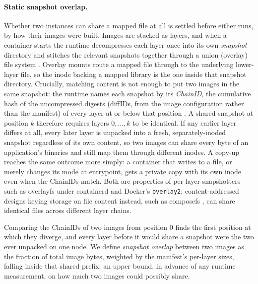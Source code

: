 \documentclass[sigplan,10pt,natbib=false]{acmart}
\begin{document}
\paragraph{Static snapshot overlap.}
Whether two instances can share a mapped file at all is settled before
either runs, by how their images were built. Images are stacked as
layers, and when a container starts the runtime decompresses each
layer once into its own \emph{snapshot} directory and stitches the
relevant snapshots together through a union (overlay) file system
\cite{ociimagespec,kerneloverlay}. Overlay mounts route a
mapped file through to the underlying lower-layer file, so the inode
backing a mapped library is the one inside that snapshot directory.
Crucially, matching content is not enough to put two images in the
same snapshot: the runtime names each snapshot by its \emph{ChainID},
the cumulative hash of the uncompressed digests (diffIDs, from the
image configuration rather than the manifest) of every layer at or
below that position \cite{ociimagespec}. A shared snapshot at position
$k$ therefore requires layers $0,\dots,k$ to be identical. If any
earlier layer differs at all, every later layer is unpacked into a
fresh, separately-inoded snapshot regardless of its own content, so
two images can share every byte of an application's binaries and still
map them through different inodes. A copy-up reaches the same outcome
more simply: a container that writes to a file, or merely changes its
mode at entrypoint, gets a private copy with its own inode even when
the ChainIDs match. Both are properties of per-layer snapshotters such
as overlayfs under containerd and Docker's \texttt{overlay2};
content-addressed designs keying storage on file content instead,
such as composefs \cite{composefs}, can share identical files across
different layer chains.

Comparing the ChainIDs of two images from position 0 finds the first
position at which they diverge, and every layer before it would share
a snapshot were the two ever unpacked on one node. We define
\emph{snapshot overlap} between two images as the fraction of total
image bytes, weighted by the manifest's per-layer sizes, falling
inside that shared prefix: an upper bound, in advance of any runtime
measurement, on how much two images could possibly share.
\end{document}
